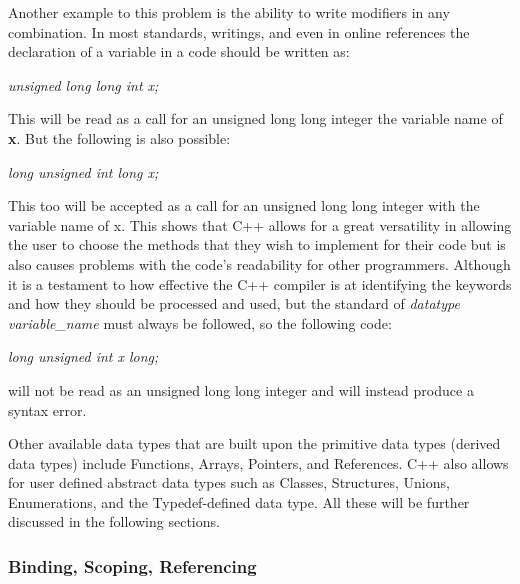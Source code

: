 \documentclass[12pt]{article}
\begin{document}
Another example to this problem is the ability to write modifiers in any combination. In most standards, writings, and even in online references the declaration of a variable in a code should be written as:
\begin{center}
  \textit{unsigned long long int x;}
\end{center}

This will be read as a call for an unsigned long long integer the variable name of \textbf{x}. But the following is also possible:
\begin{center}
  \textit{long unsigned int long x;}
\end{center}

This too will be accepted as a call for an unsigned long long integer with the variable name of x. This shows that C++ allows for a great versatility in allowing the user to choose the methods that they wish to implement for their code but is also causes problems with the code's readability for other programmers. Although it is a testament to how effective the C++ compiler is at identifying the keywords and how they should be processed and used, but the standard of \textit{datatype variable\_name} must always be followed, so the following code:
\begin{center}
  \textit{long unsigned int x long;}
\end{center}
will not be read as an unsigned long long integer and will instead produce a syntax error.

Other available data types that are built upon the primitive data types (derived data types) include Functions, Arrays, Pointers, and References.
C++ also allows for user defined abstract data types such as Classes, Structures, Unions, Enumerations, and the Typedef-defined data type. All these will be further discussed in the following sections. 

\subsubsection{Binding, Scoping, Referencing}
\end{document}
